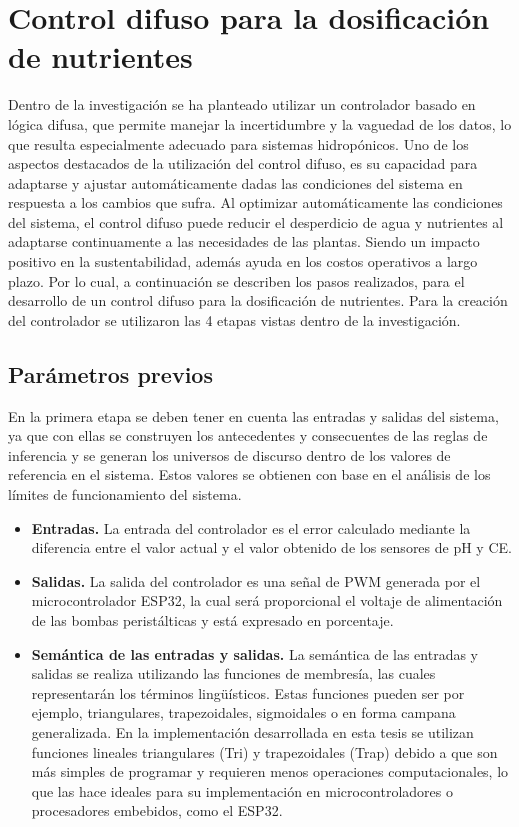\section{Control difuso para la dosificación de nutrientes}
Dentro de la investigación se ha planteado utilizar un controlador basado en lógica difusa, que permite manejar la incertidumbre y la vaguedad de los datos, lo que resulta especialmente adecuado para sistemas hidropónicos. Uno de los aspectos destacados de la utilización del control difuso, es su capacidad para adaptarse y ajustar automáticamente dadas las condiciones del sistema en respuesta a los cambios que sufra. Al optimizar automáticamente las condiciones del sistema, el control difuso puede reducir el desperdicio de agua y nutrientes al adaptarse continuamente a las necesidades de las plantas. Siendo un impacto positivo en la sustentabilidad, además ayuda en los costos operativos a largo plazo. Por lo cual, a continuación se describen los pasos realizados, para el desarrollo de un control difuso para la dosificación de nutrientes. Para la creación del controlador se utilizaron las 4 etapas vistas dentro de la investigación. 

\subsection{Parámetros previos}
En la primera etapa se deben tener en cuenta las entradas y salidas del sistema, ya que con ellas se construyen los antecedentes y consecuentes de las reglas de inferencia y se generan los universos de discurso dentro de los valores de referencia en el sistema. Estos valores se obtienen con base en el análisis de los límites de funcionamiento del sistema.
\begin{itemize}
    \item \textbf{Entradas.} La entrada del controlador es el error calculado mediante la diferencia entre el valor actual y el valor obtenido de los sensores de pH y CE. 
    \item \textbf{Salidas.} La salida del controlador es una señal de PWM generada por el microcontrolador ESP32, la cual será proporcional el voltaje de alimentación de las bombas peristálticas y está expresado en porcentaje.
    \item \textbf{Semántica de las entradas y salidas.} La semántica de las entradas y salidas se realiza utilizando las funciones de membresía, las cuales representarán los términos lingüísticos. Estas funciones pueden ser por ejemplo, triangulares, trapezoidales, sigmoidales o en forma campana generalizada. En la implementación desarrollada en esta tesis  se utilizan funciones lineales triangulares (Tri) y trapezoidales (Trap) debido a que son más simples de programar y requieren menos operaciones computacionales, lo que las hace ideales para su implementación en microcontroladores o procesadores embebidos, como el ESP32.
\end{itemize}

